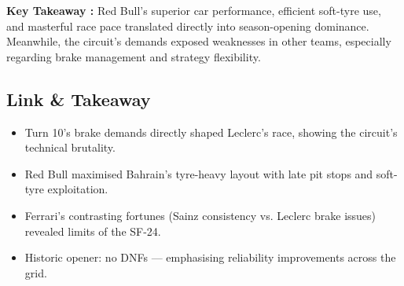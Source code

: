 \textbf{Key Takeaway :}
Red Bull’s superior car performance, efficient soft-tyre use, and masterful race pace translated directly into season-opening dominance. Meanwhile, the circuit’s demands exposed weaknesses in other teams, especially regarding brake management and strategy flexibility.


\subsection{Link \& Takeaway}

\begin{itemize}
    \item Turn 10’s brake demands directly shaped Leclerc’s race, showing the circuit’s technical brutality. 
    \item Red Bull maximised Bahrain’s tyre-heavy layout with late pit stops and soft-tyre exploitation. 
    \item Ferrari’s contrasting fortunes (Sainz consistency vs. Leclerc brake issues) revealed limits of the SF-24. 
    \item Historic opener: no DNFs — emphasising reliability improvements across the grid.
\end{itemize}
